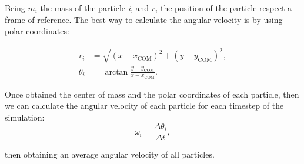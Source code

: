 Being $m_i$ the mass of the particle \textit{i}, and $r_i$ the position of the particle respect a frame of reference. The best way to calculate the angular velocity is by using polar coordinates:

\begin{align}
  r_i & = \sqrt{(x - x_{\mathrm{COM}})^2 + (y - y_{\mathrm{COM}})^2},\\ 
  \theta _i &= \arctan{\frac{y - y_{\mathrm{COM}}}{x - x_{\mathrm{COM}}}}.
\end{align}

Once obtained the center of mass and the polar coordinates of each particle, then we can calculate the angular velocity of each particle for each timestep of the simulation:
\begin{equation}
  \omega _i = \frac{\Delta \theta _i}{\Delta t},
  \label{eq:angularvelocity}
\end{equation}

then obtaining an average angular velocity of all particles.

